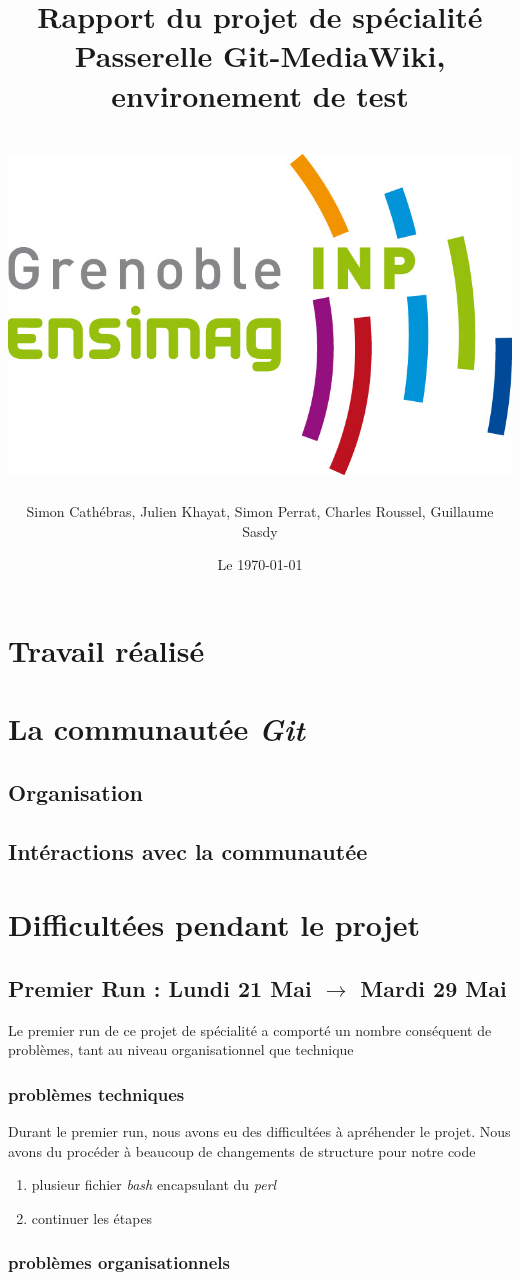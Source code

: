 \documentclass[11pt]{article}
\title{Rapport du projet de spécialité\\
Passerelle Git-MediaWiki, environement de test\\
~\\
\includegraphics[scale=0.75]{logo_ensimag.jpg} 
}
\author{Simon Cathébras, Julien Khayat, Simon Perrat, Charles Roussel, Guillaume Sasdy}
\date{Le \today}
\begin{document}
\maketitle

\section{Travail réalisé}

\section{La communautée \textit{Git}}

\subsection{Organisation}

\subsection{Intéractions avec la communautée}

\section{Difficultées pendant le projet}

\subsection{Premier Run : Lundi 21 Mai $\rightarrow$ Mardi 29 Mai}

Le premier run de ce projet de spécialité a comporté un nombre conséquent de problèmes, tant au niveau organisationnel que technique

\subsubsection{problèmes techniques}

Durant le premier run, nous avons eu des difficultées à apréhender le projet. Nous avons du procéder à beaucoup de changements de structure pour notre code
\begin{enumerate}
\item plusieur fichier \textit{bash} encapsulant du \textit{perl}
\item continuer les étapes
\end{enumerate}

\subsubsection{problèmes organisationnels}
\end{document}
